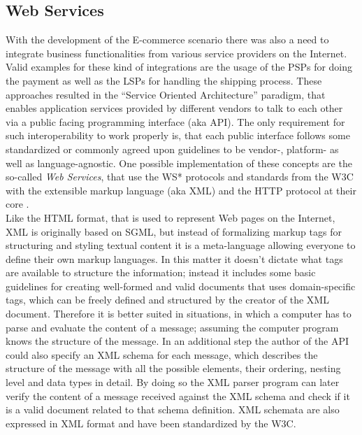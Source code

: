 
\subsection{Web Services}
\label{subsec:web_services}

With the development of the \gls{E-commerce} scenario there was also a need to integrate business functionalities from various service providers on the Internet. Valid examples for these kind of integrations are the usage of the \gls{PSP}s for doing the payment as well as the \gls{LSP}s for handling the shipping process. These approaches resulted in the ``Service Oriented Architecture'' paradigm, that enables application services provided by different vendors to talk to each other via a public facing programming interface (aka \gls{API}). The only requirement for such interoperability to work properly is, that each public interface follows some standardized or commonly agreed upon guidelines to be vendor-, platform- as well as language-agnostic. One possible implementation of these concepts are the so-called \emph{Web Services}, that use the WS* protocols and standards from the \gls{W3C} with the extensible markup language (aka \gls{XML}) and the \gls{HTTP} protocol at their core \citep{josuttis2007soa}. \\

Like the \gls{HTML} format, that is used to represent Web pages on the Internet, \gls{XML} is originally based on \gls{SGML}, but instead of formalizing markup tags for structuring and styling textual content it is a meta-language allowing everyone to define their own markup languages. In this matter it doesn’t dictate what tags are available to structure the information; instead it includes some basic guidelines for creating well-formed and valid documents that uses domain-specific tags, which can be freely defined and structured by the creator of the \gls{XML} document. Therefore it is better suited in situations, in which a computer has to parse and evaluate the content of a message; assuming the computer program knows the structure of the message. In an additional step the author of the \gls{API} could also specify an \gls{XML} schema for each message, which describes the structure of the message with all the possible elements, their ordering, nesting level and data types in detail. By doing so the \gls{XML} parser program can later verify the content of a message received against the \gls{XML} schema and check if it is a valid document related to that schema definition. \gls{XML} schemata are also expressed in \gls{XML} format and have been standardized by the \gls{W3C}. \\


